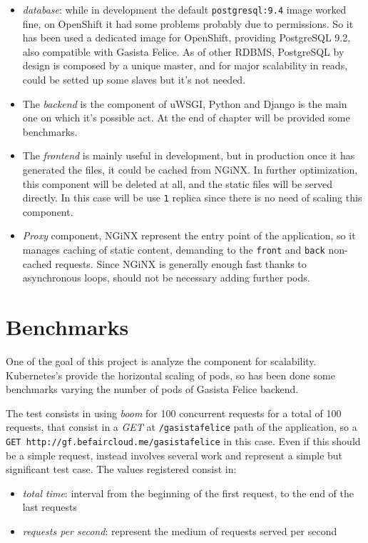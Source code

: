 \begin{itemize}
\itemsep1pt\parskip0pt
\item
  \emph{database}: while in development the default
  \texttt{postgresql:9.4} image worked fine, on OpenShift it had some
  problems probably due to permissions. So it has been used a dedicated
  image for OpenShift, providing PostgreSQL 9.2, also compatible with
  Gasista Felice. As of other RDBMS, PostgreSQL by design is composed by
  a unique master, and for major scalability in reads, could be setted
  up some slaves but it's not needed.
\item
  The \emph{backend} is the component of uWSGI, Python and Django is the
  main one on which it's possible act. At the end of chapter will be
  provided some benchmarks.
\item
  The \emph{frontend} is mainly useful in development, but in production
  once it has generated the files, it could be cached from NGiNX. In
  further optimization, this component will be deleted at all, and the
  static files will be served directly. In this case will be use
  \texttt{1} replica since there is no need of scaling this component.
\item
  \emph{Proxy} component, NGiNX represent the entry point of the
  application, so it manages caching of static content, demanding to the
  \texttt{front} and \texttt{back} non-cached requests. Since NGiNX is
  generally enough fast thanks to asynchronous loops, should not be
  necessary adding further pods.
\end{itemize}

\section{Benchmarks}\label{benchmarks}

One of the goal of this project is analyze the component for
scalability. Kubernetes's provide the horizontal scaling of pods, so has
been done some benchmarks varying the number of pods of Gasista Felice
backend.

The test consists in using \emph{boom} for 100 concurrent requests for a
total of 100 requests, that consist in a \emph{GET} at
\texttt{/gasistafelice} path of the application, so a
\texttt{GET\ http://gf.befaircloud.me/gasistafelice} in this case. Even
if this should be a simple request, instead involves several work and
represent a simple but significant test case. The values registered
consist in:

\begin{itemize}
\itemsep1pt\parskip0pt
\item
  \emph{total time}: interval from the beginning of the first request,
  to the end of the last requests
\item
  \emph{requests per second}: represent the medium of requests served
  per second
\end{itemize}

